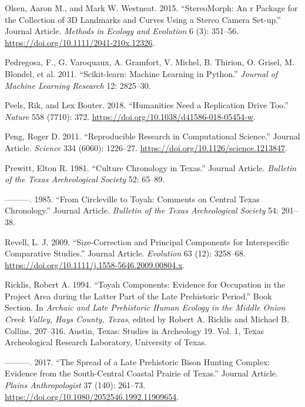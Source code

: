 \documentclass[smallextended]{svjour3}       %
\newlength{\cslhangindent}
\newlength{\cslentryspacingunit} %
\newenvironment{CSLReferences}[2] %
 {%
  \setlength{\parindent}{0pt}
  \ifodd #1
  \let\oldpar\par
  \def\par{\hangindent=\cslhangindent\oldpar}
  \fi
  \setlength{\parskip}{#2\cslentryspacingunit}
 }%
 {}
\begin{document}
\begin{CSLReferences}{1}{0}
\leavevmode{}%
Olsen, Aaron M., and Mark W. Westneat. 2015. {``StereoMorph: An r
Package for the Collection of 3D Landmarks and Curves Using a Stereo
Camera Set-up.''} Journal Article. \emph{Methods in Ecology and
Evolution} 6 (3): 351--56.
\url{https://doi.org/10.1111/2041-210x.12326}.

\leavevmode{}%
Pedregosa, F., G. Varoquaux, A. Gramfort, V. Michel, B. Thirion, O.
Grisel, M. Blondel, et al. 2011. {``{Scikit-learn: Machine Learning in
Python}.''} \emph{Journal of Machine Learning Research} 12: 2825--30.

\leavevmode{}%
Peels, Rik, and Lex Bouter. 2018. {``Humanities Need a Replication Drive
Too.''} \emph{Nature} 558 (7710): 372.
\url{https://doi.org/10.1038/d41586-018-05454-w}.

\leavevmode{}%
Peng, Roger D. 2011. {``Reproducible Research in Computational
Science.''} Journal Article. \emph{Science} 334 (6060): 1226--27.
\url{https://doi.org/10.1126/science.1213847}.

\leavevmode{}%
Prewitt, Elton R. 1981. {``{Culture Chronology in Texas}.''} Journal
Article. \emph{Bulletin of the Texas Archeological Society} 52: 65--89.

\leavevmode{}%
---------. 1985. {``{From Circleville to Toyah: Comments on Central
Texas Chronology}.''} Journal Article. \emph{Bulletin of the Texas
Archeological Society} 54: 201--38.

\leavevmode{}%
Revell, L. J. 2009. {``Size-Correction and Principal Components for
Interspecific Comparative Studies.''} Journal Article. \emph{Evolution}
63 (12): 3258--68.
\url{https://doi.org/10.1111/j.1558-5646.2009.00804.x}.

\leavevmode{}%
Ricklis, Robert A. 1994. {``{Toyah Components: Evidence for Occupation
in the Project Area during the Latter Part of the Late Prehistoric
Period}.''} Book Section. In \emph{Archaic and Late Prehistoric Human
Ecology in the Middle Onion Creek Valley, Hays County, Texas}, edited by
Robert A. Ricklis and Michael B. Collins, 207--316. Austin, Texas:
Studies in Archeology 19. Vol. 1, Texas Archeological Research
Laboratory, University of Texas.

\leavevmode{}%
---------. 2017. {``{The Spread of a Late Prehistoric Bison Hunting
Complex: Evidence from the South-Central Coastal Prairie of Texas}.''}
Journal Article. \emph{Plains Anthropologist} 37 (140): 261--73.
\url{https://doi.org/10.1080/2052546.1992.11909654}.


\end{CSLReferences}
\end{document}

